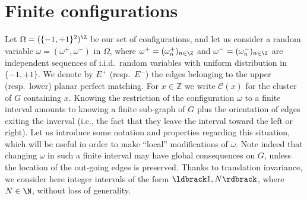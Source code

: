 \documentclass[12pt]{amsart}
\theoremstyle{remark}
\newcommand{\Li}{\ldbrack} %
\newcommand{\Ri}{\rdbrack}
\begin{document}
\section{Finite configurations}
\label{sub:finite_config} Let $\Omega=(\{-1,+1\}^2)^\Z$ be our set of configurations, and let us consider a random variable $\omega=(\omega^+,\omega^-)$ in $\Omega$, where $\omega^+=(\omega^+_n)_{n\in\Z}$ and $\omega^-=(\omega^-_n)_{n\in\Z}$ are independent sequences of i.i.d.~random variables with uniform distribution in $\{-1,+1\}$. We denote by $E^{+}$ (resp.~$E^{-}$) the edges belonging to the upper (resp.~lower) planar perfect matching. For $x \in \mathbb{Z}$ we write  $ \mathcal{C}(x)$ for the cluster of $G$ containing $x$.  
Knowing the restriction of the configuration $\omega$ to a finite interval amounts to knowing a finite sub-graph of $G$ plus the orientation of edges exiting the inverval (i.e., the fact that they leave the interval toward the left or right). Let us introduce some notation and properties regarding this situation, which will be useful in order to make ``local'' modifications of $\omega$. Note indeed that changing $\omega$ in such a finite interval may have global consequences on $G$, unless the location of the out-going edges is preserved. 
Thanks to translation invariance, we consider here integer intervals of the form $\Li1,N\Ri$, where $N\in\N$, without loss of generality. 
\end{document}
